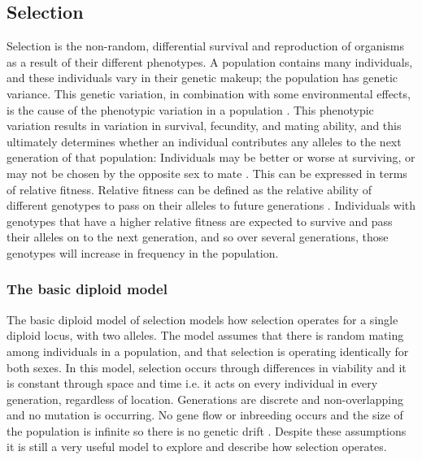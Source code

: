 \subsection{Selection}

\label{sec:Selection}

Selection is the non-random, differential survival and reproduction of organisms as a result of their different phenotypes. 
A population contains many individuals, and these individuals vary in their genetic makeup; the population has genetic variance.
This genetic variation, in combination with some environmental effects, is the cause of the phenotypic variation in a population \parencite{Ridley2004}.
This phenotypic variation results in variation in survival, fecundity, and mating ability, and this ultimately determines whether an individual contributes any alleles to the next generation of that population:
Individuals may be better or worse at surviving, or may not be chosen by the opposite sex to mate \parencite{Hedrick2010}.
This can be expressed in terms of relative fitness. Relative fitness can be defined as the relative ability of different genotypes to pass on their alleles to future generations \cite{Charlesworth2010}.
Individuals with genotypes that have a higher relative fitness are expected to survive and pass their alleles on to the next generation, and so over several generations, those genotypes will increase in frequency in the population.

\subsubsection{The basic diploid model}

The basic diploid model of selection models how selection operates for a
single diploid locus, with two alleles.
The model assumes that there is random mating among individuals in a population, and that selection is operating identically for both sexes.
In this model, selection occurs through differences in viability and it is constant through space and time i.e. it acts on every individual in every generation, regardless of location.
Generations are discrete and non-overlapping and no mutation is occurring.
No gene flow or inbreeding occurs and the size of the population is infinite so there is no genetic drift \parencite{Charlesworth2010,Hedrick2010}.
Despite these assumptions it is still a very useful model to explore and describe how selection operates.


